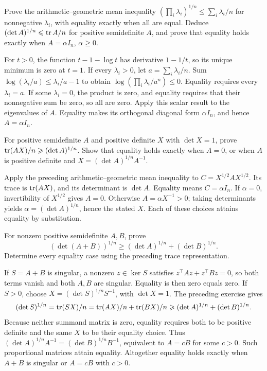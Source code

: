 \begin{problem}\label{ex:12:ineq-ma-11}
Prove the arithmetic–geometric mean inequality
\((\prod_i\lambda_i)^{1/n}\leqslant\sum_i\lambda_i/n\) for nonnegative
\(\lambda_i\), with equality exactly when all are equal.
Deduce \((\det A)^{1/n}\leqslant\operatorname{tr} A/n\) for positive semidefinite
\(A\), and prove that equality holds exactly when \(A=\alpha I_n\), \(\alpha\geqslant0\).
\end{problem}
\begin{solution}
For \(t>0\), the function \(t-1-\log t\) has derivative \(1-1/t\),
so its unique minimum is zero at \(t=1\). If every \(\lambda_i>0\),
let \(a=\sum_i\lambda_i/n\). Sum
\(\log(\lambda_i/a)\leqslant\lambda_i/a-1\) to obtain
\(\log(\prod_i\lambda_i/a^n)\leqslant0\).
Equality requires every \(\lambda_i=a\). If some \(\lambda_i=0\), the
product is zero, and equality requires that their nonnegative sum be zero,
so all are zero. Apply this scalar result to the eigenvalues of \(A\).
Equality makes its orthogonal diagonal form \(\alpha I_n\), and hence
\(A=\alpha I_n\).
\end{solution}

\begin{problem}\label{ex:12:ineq-ma-12}
For positive semidefinite \(A\) and positive definite \(X\) with
\(\det X=1\), prove \(\operatorname{tr}(AX)/n\geqslant(\det A)^{1/n}\).
Show that equality holds exactly when \(A=0\), or when \(A\) is positive
definite and \(X=(\det A)^{1/n}A^{-1}\).
\end{problem}
\begin{solution}
Apply the preceding arithmetic–geometric mean inequality to
\(C=X^{1/2}AX^{1/2}\). Its trace is \(\operatorname{tr}(AX)\), and its determinant
is \(\det A\). Equality means \(C=\alpha I_n\).
If \(\alpha=0\), invertibility of \(X^{1/2}\) gives \(A=0\).
Otherwise \(A=\alpha X^{-1}>0\); taking determinants yields
\(\alpha=(\det A)^{1/n}\), hence the stated \(X\).
Each of these choices attains equality by substitution.
\end{solution}

\begin{problem}\label{ex:12:ineq-ma-13}
For nonzero positive semidefinite \(A,B\), prove
\[
(\det(A+B))^{1/n}\geqslant(\det A)^{1/n}+(\det B)^{1/n}.
\]
Determine every equality case using the preceding trace representation.
\end{problem}
\begin{solution}
If \(S=A+B\) is singular, a nonzero \(z\in\ker S\) satisfies
\(z^\top Az+z^\top Bz=0\), so both terms vanish and both \(A,B\)
are singular. Equality is then zero equals zero.
If \(S>0\), choose \(X=(\det S)^{1/n}S^{-1}\), with \(\det X=1\).
The preceding exercise gives
\[
(\det S)^{1/n}=\operatorname{tr}(SX)/n=\operatorname{tr}(AX)/n+\operatorname{tr}(BX)/n
\geqslant(\det A)^{1/n}+(\det B)^{1/n}.
\]
Because neither summand matrix is zero, equality requires both to be
positive definite and the same \(X\) to be their equality choice.
Thus \((\det A)^{1/n}A^{-1}=(\det B)^{1/n}B^{-1}\), equivalent to
\(A=cB\) for some \(c>0\). Such proportional matrices attain equality.
Altogether equality holds exactly when \(A+B\) is singular or \(A=cB\)
with \(c>0\).
\end{solution}

